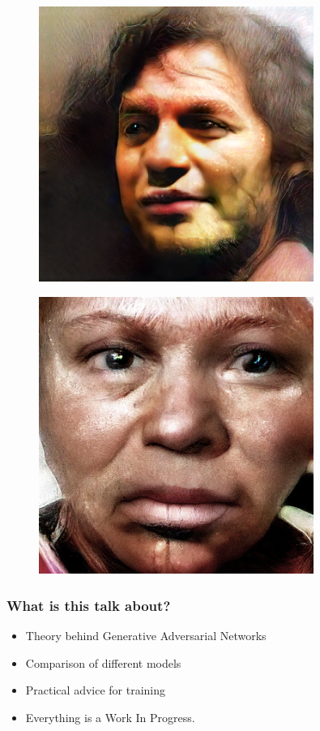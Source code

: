 \documentclass{beamer}
\begin{document}
\begin{frame}
\begin{figure}[h!]
	\centering
	\includegraphics[width=0.8\textwidth]{4k_man.jpg}
\end{figure}
\end{frame}

\begin{frame}
\begin{figure}[h!]
	\centering
	\includegraphics[width=0.8\textwidth]{4k_black_woman.jpg}
\end{figure}
\end{frame}
\begin{frame}
\frametitle{What is this talk about?}
\begin{itemize}
	\item Theory behind Generative Adversarial Networks
	\item Comparison of different models
	\item Practical advice for training
	\item Everything is a Work In Progress.
\end{itemize}

\end{frame}
\end{document}
